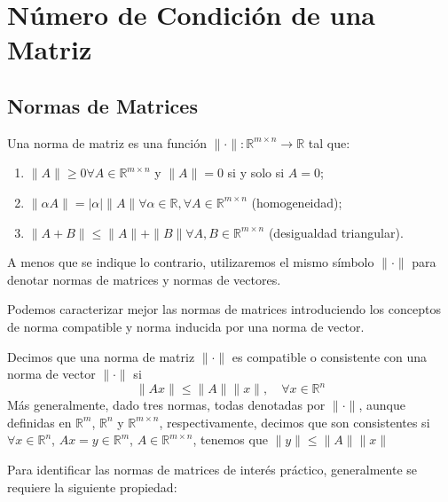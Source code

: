 \chapter{Número de Condición de una Matriz}

\section{Normas de Matrices}
\begin{definition}
    Una norma de matriz es una función $\|\cdot\|: \mathbb{R}^{m \times n} \rightarrow \mathbb{R}$ tal que:
    \begin{enumerate}
        \item $\|A\| \geq 0 \forall A \in \mathbb{R}^{m \times n}$ y $\|A\| = 0$ si y solo si $A = 0$;
        \item $\|\alpha A\| = |\alpha| \|A\| \forall \alpha \in \mathbb{R}, \forall A \in \mathbb{R}^{m \times n}$ (homogeneidad);
        \item $\| A + B\| \leq \|A\| + \|B\| \forall A, B \in \mathbb{R}^{m \times n}$ (desigualdad triangular).
    \end{enumerate}
    \label{Def: 1.19}
\end{definition}

A menos que se indique lo contrario, utilizaremos el mismo símbolo $\|\cdot\|$ para denotar normas de matrices y normas de vectores.

Podemos caracterizar mejor las normas de matrices introduciendo los conceptos de norma compatible y norma inducida por una norma de vector.

\begin{definition}
    Decimos que una norma de matriz $\|\cdot\|$ es compatible o consistente con una norma de vector $\|\cdot\|$ si
    \begin{equation}
        \|Ax\| \leq \|A\| \|x\|, \quad \forall x \in \mathbb{R}^n
        \label{Eq: (1.16)}
    \end{equation}
    Más generalmente, dado tres normas, todas denotadas por $\|\cdot\|$, aunque definidas en $\mathbb{R}^m$, $\mathbb{R}^n$ y $\mathbb{R}^{m \times n}$, respectivamente, decimos que son consistentes si $\forall x \in \mathbb{R}^n$, $Ax = y \in \mathbb{R}^m$, $A \in \mathbb{R}^{m \times n}$, tenemos que $\|y\| \leq \|A\| \|x\|$
\end{definition}

Para identificar las normas de matrices de interés práctico, generalmente se requiere la siguiente propiedad:

